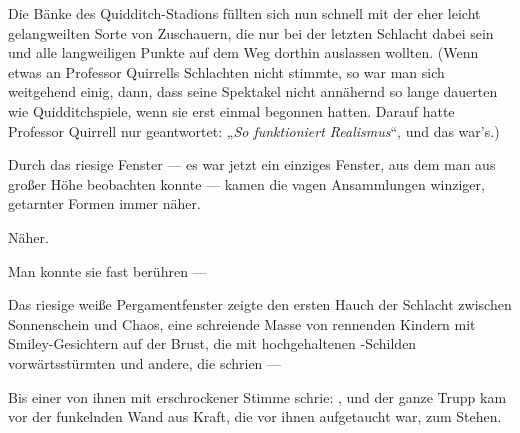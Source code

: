 Die Bänke des Quidditch-Stadions füllten sich nun schnell mit der eher leicht gelangweilten Sorte von Zuschauern, die nur bei der letzten Schlacht dabei sein und alle langweiligen Punkte auf dem Weg dorthin auslassen wollten. (Wenn etwas an Professor Quirrells Schlachten nicht stimmte, so war man sich weitgehend einig, dann, dass seine Spektakel nicht annähernd so lange dauerten wie Quidditchspiele, wenn sie erst einmal begonnen hatten. Darauf hatte Professor Quirrell nur geantwortet:
„\emph{So funktioniert Realismus}“, und das war’s.)

Durch das riesige Fenster — es war jetzt ein einziges Fenster, aus dem man aus großer Höhe beobachten konnte — kamen die vagen Ansammlungen winziger, getarnter Formen immer näher.

Näher.

Man konnte sie fast berühren —

\later

Das riesige weiße Pergamentfenster zeigte den ersten Hauch der Schlacht zwischen Sonnenschein und Chaos, eine schreiende Masse von rennenden Kindern mit Smiley-Gesichtern auf der Brust, die mit hochgehaltenen -Schilden vorwärtsstürmten und andere, die  schrien —

Bis einer von ihnen mit erschrockener Stimme schrie: , und der ganze Trupp kam vor der funkelnden Wand aus Kraft, die vor ihnen aufgetaucht war, zum Stehen.

